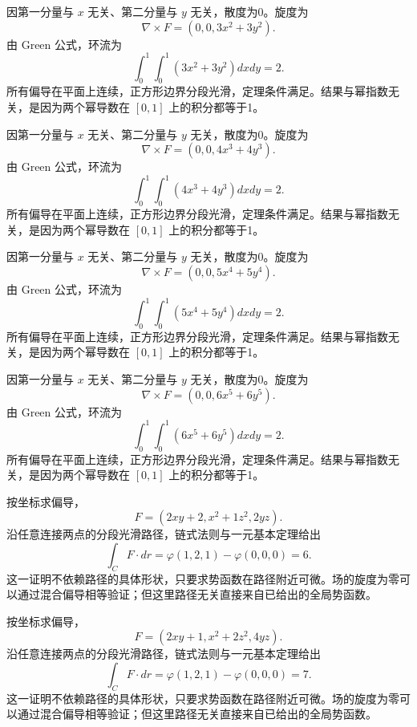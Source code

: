 \documentclass[UTF8,12pt,a4paper,fontset=fandol]{ctexart}
\begin{document}
\begin{solve}\label{ans:c44q9}
因第一分量与 $x$ 无关、第二分量与 $y$ 无关，散度为0。旋度为
\[
\nabla\times F=(0,0,3x^{2}+3y^{2}).
\]
由 Green 公式，环流为
\[
\int_0^1\int_0^1(3x^{2}+3y^{2})dxdy=2.
\]
所有偏导在平面上连续，正方形边界分段光滑，定理条件满足。结果与幂指数无关，是因为两个幂导数在 $[0,1]$ 上的积分都等于1。
\end{solve}

\begin{solve}\label{ans:c44q10}
因第一分量与 $x$ 无关、第二分量与 $y$ 无关，散度为0。旋度为
\[
\nabla\times F=(0,0,4x^{3}+4y^{3}).
\]
由 Green 公式，环流为
\[
\int_0^1\int_0^1(4x^{3}+4y^{3})dxdy=2.
\]
所有偏导在平面上连续，正方形边界分段光滑，定理条件满足。结果与幂指数无关，是因为两个幂导数在 $[0,1]$ 上的积分都等于1。
\end{solve}

\begin{solve}\label{ans:c44q11}
因第一分量与 $x$ 无关、第二分量与 $y$ 无关，散度为0。旋度为
\[
\nabla\times F=(0,0,5x^{4}+5y^{4}).
\]
由 Green 公式，环流为
\[
\int_0^1\int_0^1(5x^{4}+5y^{4})dxdy=2.
\]
所有偏导在平面上连续，正方形边界分段光滑，定理条件满足。结果与幂指数无关，是因为两个幂导数在 $[0,1]$ 上的积分都等于1。
\end{solve}

\begin{solve}\label{ans:c44q12}
因第一分量与 $x$ 无关、第二分量与 $y$ 无关，散度为0。旋度为
\[
\nabla\times F=(0,0,6x^{5}+6y^{5}).
\]
由 Green 公式，环流为
\[
\int_0^1\int_0^1(6x^{5}+6y^{5})dxdy=2.
\]
所有偏导在平面上连续，正方形边界分段光滑，定理条件满足。结果与幂指数无关，是因为两个幂导数在 $[0,1]$ 上的积分都等于1。
\end{solve}

\begin{solve}\label{ans:c44q13}
按坐标求偏导，
\[
F=(2xy+2,x^2+1z^2,2yz).
\]
沿任意连接两点的分段光滑路径，链式法则与一元基本定理给出
\[
\int_CF\cdot dr=\varphi(1,2,1)-\varphi(0,0,0)=6.
\]
这一证明不依赖路径的具体形状，只要求势函数在路径附近可微。场的旋度为零可以通过混合偏导相等验证；但这里路径无关直接来自已给出的全局势函数。
\end{solve}

\begin{solve}\label{ans:c44q14}
按坐标求偏导，
\[
F=(2xy+1,x^2+2z^2,4yz).
\]
沿任意连接两点的分段光滑路径，链式法则与一元基本定理给出
\[
\int_CF\cdot dr=\varphi(1,2,1)-\varphi(0,0,0)=7.
\]
这一证明不依赖路径的具体形状，只要求势函数在路径附近可微。场的旋度为零可以通过混合偏导相等验证；但这里路径无关直接来自已给出的全局势函数。
\end{solve}
\end{document}
